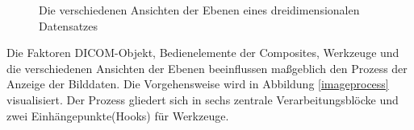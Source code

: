 \begin{figure}[htb]
\centering
{}
\caption{Die verschiedenen Ansichten der Ebenen eines dreidimensionalen Datensatzes}
\label{layers}
\end{figure}

Die Faktoren DICOM-Objekt, Bedienelemente der Composites, Werkzeuge und die verschiedenen Ansichten der Ebenen beeinflussen maßgeblich den Prozess der Anzeige der Bilddaten. Die Vorgehensweise wird in Abbildung \ref{imageprocess} visualisiert. Der Prozess gliedert sich in sechs zentrale Verarbeitungsblöcke und zwei Einhängepunkte(Hooks) für Werkzeuge.

